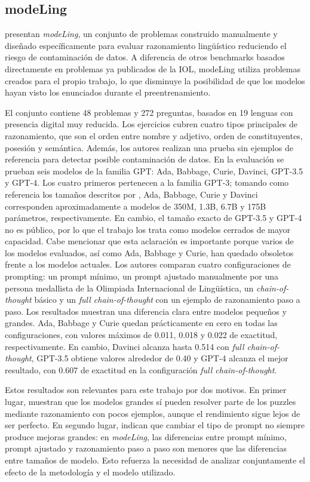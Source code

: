\subsection{modeLing}

\citet{chi2024modeling} presentan \textit{modeLing}, un conjunto de problemas construido manualmente y diseñado específicamente para evaluar razonamiento lingüístico reduciendo el riesgo de contaminación de datos. A diferencia de otros benchmarks basados directamente en problemas ya publicados de la IOL, modeLing utiliza problemas creados para el propio trabajo, lo que disminuye la posibilidad de que los modelos hayan visto los enunciados durante el preentrenamiento.

El conjunto contiene 48 problemas y 272 preguntas, basados en 19 lenguas con presencia digital muy reducida. Los ejercicios cubren cuatro tipos principales de razonamiento, que son el orden entre nombre y adjetivo, orden de constituyentes, posesión y semántica. Además, los autores realizan una prueba sin ejemplos de referencia para detectar posible contaminación de datos. En la evaluación se prueban seis modelos de la familia GPT: Ada, Babbage, Curie, Davinci, GPT-3.5 y GPT-4. Los cuatro primeros pertenecen a la familia GPT-3; tomando como referencia los tamaños descritos por \citet{brown2020language}, Ada, Babbage, Curie y Davinci corresponden aproximadamente a modelos de 350M, 1.3B, 6.7B y 175B parámetros, respectivamente. En cambio, el tamaño exacto de GPT-3.5 y GPT-4 no es público, por lo que el trabajo los trata como modelos cerrados de mayor capacidad. Cabe mencionar que esta aclaración es importante porque varios de los modelos evaluados, así como Ada, Babbage y Curie, han quedado obsoletos frente a los modelos actuales. Los autores comparan cuatro configuraciones de prompting: un prompt mínimo, un prompt ajustado manualmente por una persona medallista de la Olimpiada Internacional de Lingüística, un \textit{chain-of-thought} básico y un \textit{full chain-of-thought} con un ejemplo de razonamiento paso a paso. Los resultados muestran una diferencia clara entre modelos pequeños y grandes. Ada, Babbage y Curie quedan prácticamente en cero en todas las configuraciones, con valores máximos de 0.011, 0.018 y 0.022 de exactitud, respectivamente. En cambio, Davinci alcanza hasta 0.514 con \textit{full chain-of-thought}, GPT-3.5 obtiene valores alrededor de 0.40 y GPT-4 alcanza el mejor resultado, con 0.607 de exactitud en la configuración \textit{full chain-of-thought}. 

Estos resultados son relevantes para este trabajo por dos motivos. En primer lugar, muestran que los modelos grandes sí pueden resolver parte de los puzzles mediante razonamiento con pocos ejemplos, aunque el rendimiento sigue lejos de ser perfecto. En segundo lugar, indican que cambiar el tipo de prompt no siempre produce mejoras grandes: en \textit{modeLing}, las diferencias entre prompt mínimo, prompt ajustado y razonamiento paso a paso son menores que las diferencias entre tamaños de modelo. Esto refuerza la necesidad de analizar conjuntamente el efecto de la metodología y el modelo utilizado.

